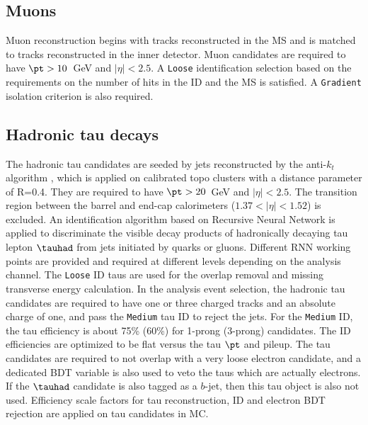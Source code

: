 \subsection{Muons}
Muon reconstruction begins with tracks reconstructed in the MS and is matched to tracks reconstructed in the inner detector. Muon candidates are required to have $\pt>10$~GeV and $|\eta|<2.5$. A \texttt{Loose} identification selection \cite{MuonSelectionTool} based on the requirements on the number of hits in the ID and the MS is satisfied. A \texttt{Gradient} isolation \cite{IsolationWP} criterion is also required.

\subsection{Hadronic tau decays}
The hadronic tau candidates \cite{tau_sys1} are seeded by jets reconstructed by the anti-$k_t$ algorithm \cite{antikt}, which is applied on calibrated topo clusters \cite{topocluster} with a distance parameter of R=0.4. They are required to have $\pt > 20$~GeV and $|\eta|<2.5$. The transition region between the barrel and end-cap calorimeters ($1.37<|\eta|<1.52$) is excluded. An identification algorithm based on Recursive Neural Network \cite{tau_sys2} is applied to discriminate the visible decay products of hadronically decaying tau lepton $\tauhad$ from jets initiated by quarks or gluons. Different RNN working points are provided and required at different levels depending on the analysis channel. %
The \texttt{Loose} ID taus are used for the overlap removal and missing transverse energy calculation.
In the analysis event selection, the hadronic tau candidates are required to have one or three charged tracks and an absolute charge of one, and pass the \texttt{Medium} tau ID to reject the jets.
For the \texttt{Medium} ID, the tau efficiency is about 75\% (60\%) for 1-prong (3-prong) candidates. The ID efficiencies are optimized to be flat versus the tau $\pt$ and pileup.
The tau candidates are required to not overlap with a very loose electron candidate, and a dedicated BDT variable is also used to veto the taus which are actually electrons.
If the $\tauhad$ candidate is also tagged as a $b$-jet, then this tau object is also not used. Efficiency scale factors for tau reconstruction, ID and electron BDT rejection \cite{TauCP} are applied on tau candidates in MC.

